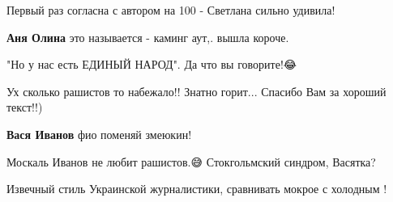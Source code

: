 \begin{itemize}
Первый раз согласна с автором на 100 - Светлана сильно удивила!

\begin{itemize}
 
\textbf{Аня Олина} это называется - каминг аут,. вышла короче.
\end{itemize}

 
"Но у нас есть ЕДИНЫЙ НАРОД". Да что вы говорите!😂

 
Ух сколько рашистов то набежало!! Знатно горит... Спасибо Вам за хороший текст!!)

\begin{itemize}
 
\textbf{Вася Иванов} фио поменяй змеюкин!

 
Москаль Иванов не любит рашистов.😅 Стокгольмский синдром, Васятка?
\end{itemize}

 
Извечный стиль Украинской журналистики, сравнивать мокрое с холодным !

 

\end{itemize}

